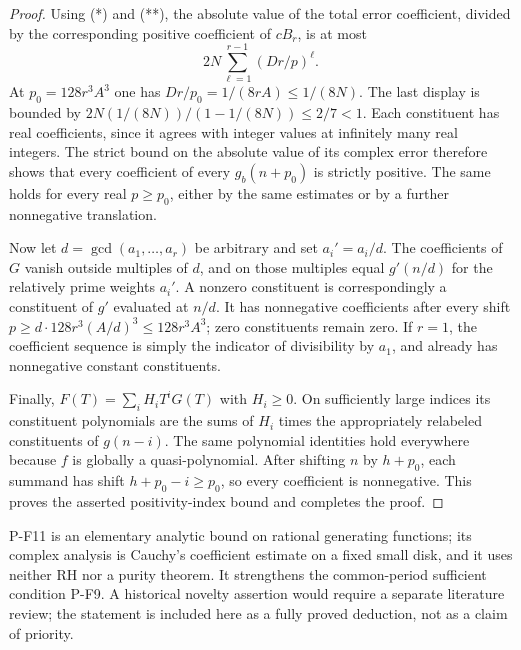 \begin{proof}
Using (*) and (**), the absolute value of the total error coefficient,
divided by the corresponding positive coefficient of $cB_r$, is at most
\[
 2N\sum_{\ell=1}^{r-1}(Dr/p)^\ell.
\]
At $p_0=128r^3A^3$ one has $Dr/p_0=1/(8rA)\le1/(8N)$.
The last display is bounded by
$2N(1/(8N))/(1-1/(8N))\le2/7<1$.
Each constituent has real coefficients, since it agrees with integer
values at infinitely many real integers. The strict bound on the
absolute value of its complex error therefore shows that every
coefficient of every $g_b(n+p_0)$ is strictly positive.
The same holds for every real $p\ge p_0$, either by the same estimates
or by a further nonnegative translation.

Now let $d=\gcd(a_1,\ldots,a_r)$ be arbitrary and set $a_i'=a_i/d$.
The coefficients of $G$ vanish outside multiples of $d$, and on those
multiples equal $g'(n/d)$ for the relatively prime weights $a_i'$.
A nonzero constituent is correspondingly a constituent of $g'$ evaluated
at $n/d$. It has nonnegative coefficients after every shift
$p\ge d\cdot128r^3(A/d)^3\le128r^3A^3$; zero constituents remain zero.
If $r=1$, the coefficient sequence is simply the indicator of divisibility
by $a_1$, and already has nonnegative constant constituents.

Finally, $F(T)=\sum_i H_iT^iG(T)$ with $H_i\ge0$.
On sufficiently large indices its constituent polynomials are the sums
of $H_i$ times the appropriately relabeled constituents of $g(n-i)$.
The same polynomial identities hold everywhere because $f$ is globally
a quasi-polynomial. After shifting $n$ by $h+p_0$, each summand has
shift $h+p_0-i\ge p_0$, so every coefficient is nonnegative.
This proves the asserted positivity-index bound and completes the proof.
\end{proof}

P-F11 is an elementary analytic bound on rational generating functions;
its complex analysis is Cauchy's coefficient estimate on a fixed small
disk, and it uses neither RH nor a purity theorem. It strengthens the
common-period sufficient condition P-F9. A historical novelty assertion
would require a separate literature review; the statement is included
here as a fully proved deduction, not as a claim of priority.
